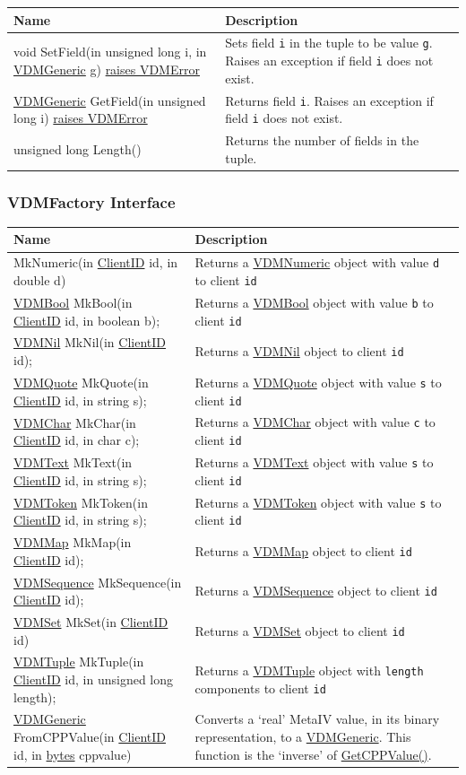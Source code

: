 \documentclass[\pformat,12pt]{article}
\newcommand{\pbs}[1]{\let\temp=\\#1\let\\=\temp}
\newenvironment{interfacetable}{%
  \begin{longtable}{|>{\pbs\raggedright\ttfamily}p{6.6cm}%
                    |>{\pbs\raggedright}p{6.6cm}|} \hline
  \textrm{\bfseries Name} &  \textbf{Description} \\ \hline
  \endhead
  }{\end{longtable}}
\newcommand{\VDMError}{\hyperlink{exception.VDMError}{raises VDMError}}
\newcommand{\VDMGeneric}{\hyperlink{interface.Generic}{VDMGeneric}}
\newcommand{\ClientID}{\hyperlink{type.ClientID}{ClientID}}
\newcommand{\bytes}{\hyperlink{type.bytes}{bytes}}
\newcommand{\VDMBool}{\hyperlink{interface.VDMBool}{VDMBool}}
\newcommand{\VDMChar}{\hyperlink{interface.VDMChar}{VDMChar}}
\newcommand{\VDMNumeric}{\hyperlink{interface.VDMNumeric}{VDMNumeric}}
\newcommand{\VDMQuote}{\hyperlink{interface.VDMQuote}{VDMQuote}}
\newcommand{\VDMText}{\hyperlink{interface.VDMText}{VDMText}}
\newcommand{\VDMToken}{\hyperlink{interface.VDMToken}{VDMToken}}
\newcommand{\VDMNil}{\hyperlink{interface.VDMNil}{VDMNil}}
\newcommand{\VDMMap}{\hyperlink{interface.VDMMap}{VDMMap}}
\newcommand{\VDMSequence}{\hyperlink{interface.VDMSequence}{VDMSequence}}
\newcommand{\VDMSet}{\hyperlink{interface.VDMSet}{VDMSet}}
\newcommand{\VDMTuple}{\hyperlink{interface.VDMTuple}{VDMTuple}}
\begin{document}
\begin{interfacetable}
void SetField(in unsigned long i, in {\VDMGeneric} g) {\VDMError}
 & Sets field \texttt{i} in the tuple to be value \texttt{g}. Raises
   an exception if field \texttt{i} does not exist.
\\ \hline
{\VDMGeneric} GetField(in unsigned long i) {\VDMError}
 & Returns field \texttt{i}. Raises
   an exception if field \texttt{i} does not exist.
\\ \hline
unsigned long Length() 
 & Returns the number of fields in the tuple.
\\ \hline
\end{interfacetable}

\subsubsection{VDMFactory Interface}
\mbox{}
\begin{interfacetable}
{\VDMNumeric} MkNumeric(in {\ClientID} id, in double d)
  & Returns a {\VDMNumeric} object with value \texttt{d} to client
  \texttt{id} \\ \hline
{\VDMBool} MkBool(in {\ClientID} id, in boolean b);
  & Returns a {\VDMBool} object with value \texttt{b} to client
  \texttt{id} \\ \hline
{\VDMNil} MkNil(in {\ClientID} id);
  & Returns a {\VDMNil} object to client \texttt{id} \\ \hline
{\VDMQuote} MkQuote(in {\ClientID} id, in string s);
  & Returns a {\VDMQuote} object with value \texttt{s} to client
  \texttt{id} \\ \hline
{\VDMChar}  MkChar(in {\ClientID} id, in char c);
  & Returns a {\VDMChar} object with value \texttt{c} to client
  \texttt{id} \\ \hline
{\VDMText}  MkText(in {\ClientID} id, in string s);
  & Returns a {\VDMText} object with value \texttt{s} to client
  \texttt{id} \\ \hline
{\VDMToken}  MkToken(in {\ClientID} id, in string s);
  & Returns a {\VDMToken} object with value \texttt{s} to client
  \texttt{id} \\ \hline
{\VDMMap}  MkMap(in {\ClientID} id);
  & Returns a {\VDMMap} object to client \texttt{id} \\ \hline
{\VDMSequence}  MkSequence(in {\ClientID} id);
  & Returns a {\VDMSequence} object to client \texttt{id} \\ \hline
{\VDMSet}  MkSet(in {\ClientID} id) 
  & Returns a {\VDMSet} object to client \texttt{id} \\ \hline
{\VDMTuple} MkTuple(in {\ClientID} id, in unsigned long length);
  & Returns a {\VDMTuple} object with \texttt{length} components to client
  \texttt{id} \\ \hline
{\VDMGeneric}  FromCPPValue(in {\ClientID} id, in {\bytes} cppvalue)
  & Converts a `real' MetaIV value, in its binary representation, to
    a {\VDMGeneric}. This function is the `inverse' of 
    \hyperlink{method.VDMGenericGetCPPValue}{GetCPPValue()}. \\ \hline
\end{interfacetable}
\end{document}
